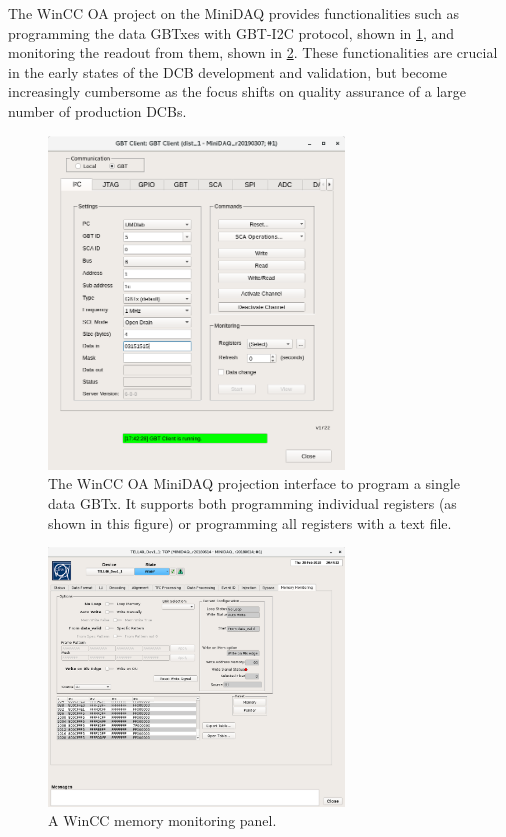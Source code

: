 The WinCC OA project on the MiniDAQ provides functionalities such as programming
the data GBTxes with GBT-I2C protocol,
shown in \cref{fig:wincc-oa-gbt},
and monitoring the readout from them,
shown in \cref{fig:wincc-oa-memmon}.
These functionalities are crucial in the early states of the DCB development and
validation,
but become increasingly cumbersome as the focus shifts on quality assurance
of a large number of production DCBs.

\begin{figure}[!htb]
    \centering
    \includegraphics[width=0.7\textwidth]{./figs-ut-upgrade/online/gbt_client_slave_gbt_i2c_test.png}
    \caption{
        The WinCC OA MiniDAQ projection interface to program a single data GBTx.
        It supports both programming individual registers (as shown in this
        figure) or programming all registers with a text file.
    }
    \label{fig:wincc-oa-gbt}
\end{figure}

\begin{figure}[!htb]
    \centering
    \includegraphics[width=0.7\textwidth]{./figs-ut-upgrade/online/memory_monitoring_panel.png}
    \caption{
        A WinCC memory monitoring panel.
    }
    \label{fig:wincc-oa-memmon}
\end{figure}


